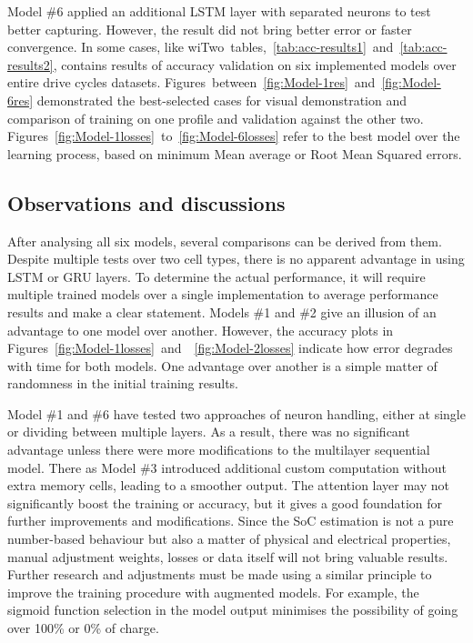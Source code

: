 %
%
Model \#6 applied an additional LSTM layer with separated neurons to test better capturing.
However, the result did not bring better error or faster convergence.
In some cases, like wi\mbox{Two tables, \ref{tab:acc-results1} and \ref{tab:acc-results2}}, contains results of accuracy validation on six implemented models over entire drive cycles datasets.
\mbox{Figures between \ref{fig:Model-1res} and \ref{fig:Model-6res}} demonstrated the best-selected cases for visual demonstration and comparison of training on one profile and validation against the other two.
\mbox{Figures \ref{fig:Model-1losses} to \ref{fig:Model-6losses}} refer to the best model over the learning process, based on minimum Mean average or Root Mean Squared errors.

%
%
\subsection{Observations and discussions}
After analysing all six models, several comparisons can be derived from them.
Despite multiple tests over two cell types, there is no apparent advantage in using LSTM or GRU layers.
To determine the actual performance, it will require multiple trained models over a single implementation to average performance results and make a clear statement.
Models \#1 and \#2 give an illusion of an advantage to one model over another.
However, the accuracy plots in \mbox{Figures~\ref{fig:Model-1losses} and ~\ref{fig:Model-2losses}} indicate how error degrades with time for both models.
One advantage over another is a simple matter of randomness in the initial training results.

%
%
Model \#1 and \#6 have tested two approaches of neuron handling, either at single or dividing between multiple layers.
As a result, there was no significant advantage unless there were more modifications to the multilayer sequential model.
There as Model \#3 introduced additional custom computation without extra memory cells, leading to a smoother output.
The attention layer may not significantly boost the training or accuracy, but it gives a good foundation for further improvements and modifications.
Since the SoC estimation is not a pure number-based behaviour but also a matter of physical and electrical properties, manual adjustment weights, losses or data itself will not bring valuable results.
Further research and adjustments must be made using a similar principle to improve the training procedure with augmented models. 
For example, the sigmoid function selection in the model output minimises the possibility of going over 100\% or 0\% of charge.

